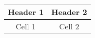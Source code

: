 \begin{tabular}{|c|c|}
    \hline
    \textbf{Header 1} & \textbf{Header 2} \\
    \hline
    Cell 1 & Cell 2 \\
    \hline
\end{tabular}